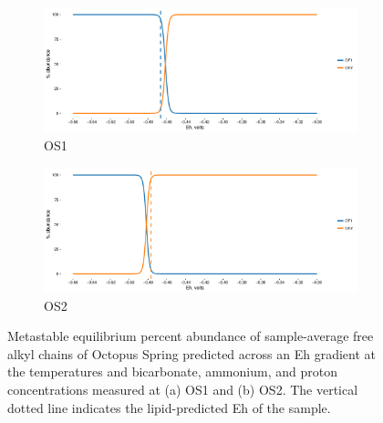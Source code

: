 \newpage

\begin{figure}[h]
\centering

    \begin{subfigure}[b]{\linewidth}
       	\includegraphics[width=1\linewidth]{"figs_app2/Octopus OF1_thermo"}
       	\caption{OS1}
        \label{fig:OS1_thermo}
    \end{subfigure}
    \begin{subfigure}[b]{\linewidth}
    	\includegraphics[width=1\linewidth]{"figs_app2/Octopus OF2_thermo"}
    	\caption{OS2}
        \label{fig:OS2_thermo}
    \end{subfigure}
    
    \caption{Metastable equilibrium percent abundance of sample-average free alkyl chains of Octopus Spring predicted across an Eh gradient at the temperatures and bicarbonate, ammonium, and proton concentrations measured at (a) OS1 and (b) OS2. The vertical dotted line indicates the lipid-predicted Eh of the sample.}
    \label{fig:OS_thermo}
\end{figure}

\newpage

